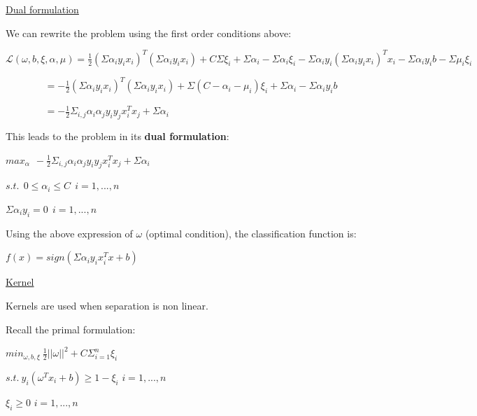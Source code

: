 \vspace{5mm}

\underline{Dual formulation}

\vspace{5mm}

We can rewrite the problem using the first order conditions above:

$\mathcal{L}(\omega,b,\xi, \alpha, \mu) = \frac{1}{2}(\Sigma \alpha_i y_i x_i)^T(\Sigma \alpha_i y_i x_i)+C\Sigma \xi_i + \Sigma \alpha_i - \Sigma \alpha_i \xi_i - \Sigma \alpha_i y_i (\Sigma \alpha_i y_i x_i)^T x_i - \Sigma \alpha_i y_i b - \Sigma \mu_i \xi_i$

$~~~~~~~~~~~~~~~~~~ = -\frac{1}{2}(\Sigma \alpha_i y_i x_i)^T(\Sigma \alpha_i y_i x_i) + \Sigma(C - \alpha_i - \mu_i)\xi_i + \Sigma \alpha_i - \Sigma \alpha_i y_i b$

$~~~~~~~~~~~~~~~~~~ = -\frac{1}{2}\Sigma_{i,j} \alpha_i \alpha_j y_i y_j x_i^T x_j + \Sigma \alpha_i$

\vspace{5mm}

This leads to the problem in its \textbf{dual formulation}:

\begin{center}

$max_\alpha~~-\frac{1}{2}\Sigma_{i,j} \alpha_i \alpha_j y_i y_j x_i^T x_j + \Sigma \alpha_i$

$s.t.~~0 \leq \alpha_i \leq C~~i=1,...,n$

$\Sigma \alpha_i y_i = 0~~i=1,...,n$

\end{center}

\vspace{5mm}

Using the above expression of $\omega$ (optimal condition), the classification function is:

\begin{center}
$f(x)=sign(\Sigma \alpha_i y_i x_i^T x + b)$
\end{center}

\vspace{5mm}

\underline{Kernel}

\vspace{5mm}

Kernels are used when separation is non linear.

Recall the primal formulation:

\begin{center}
$min_{\omega,b, \xi}~\frac{1}{2}||\omega||^2+C\Sigma_{i=1}^{n}\xi_i$

$s.t.~y_i(\omega^Tx_i+b) \geq 1 - \xi_i$ $i=1,...,n$

$\xi_i \geq 0$ $i=1,...,n$
\end{center}

